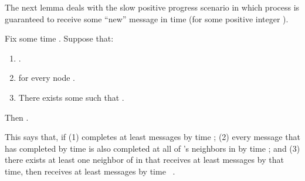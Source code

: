 The next lemma deals with the slow positive progress scenario in which  process  is guaranteed to receive some ``new'' message in  time (for some positive integer ).


\begin{lemma}
Fix some time . Suppose that:
\begin{enumerate}

\item
.

\item
 for every node .

\item
There exists some  such that .
\label{item: condition: there exists some j'' s t Rj''(t) geq ell}

\end{enumerate}
Then .
\label{lemma: progress in z cdot Fack}
\end{lemma}

\noindent This says that, if
(1)  completes at least  messages by time ;
(2) every message that  has completed by time  is also completed at all of 's
neighbors in  by time ; and
(3) there exists at least one neighbor of  in  that receives at least  messages by that time,
then  receives
at least  messages by time ~.


